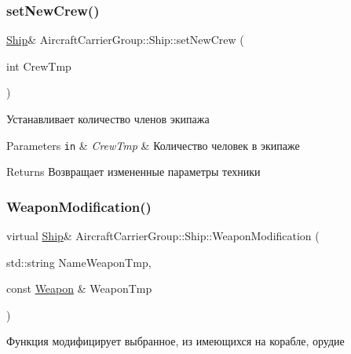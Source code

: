 \subsubsection{\texorpdfstring{set\+New\+Crew()}{setNewCrew()}}
{\footnotesize\ttfamily \mbox{\hyperlink{class_aircraft_carrier_group_1_1_ship}{Ship}}\& Aircraft\+Carrier\+Group\+::\+Ship\+::set\+New\+Crew (\begin{DoxyParamCaption}\item[{int}]{Crew\+Tmp }\end{DoxyParamCaption})\hspace{0.3cm}{\ttfamily [inline]}}



Устанавливает количество членов экипажа 


\begin{DoxyParams}[1]{Parameters}
\mbox{\tt in}  & {\em Crew\+Tmp} & Количество человек в экипаже \\
\hline
\end{DoxyParams}
\begin{DoxyReturn}{Returns}
Возвращает измененные параметры техники 
\end{DoxyReturn}
\mbox{\label{class_aircraft_carrier_group_1_1_ship_a3f91c1ad2960c095cfd88e85df0a3990}} 
\subsubsection{\texorpdfstring{Weapon\+Modification()}{WeaponModification()}}
{\footnotesize\ttfamily virtual \mbox{\hyperlink{class_aircraft_carrier_group_1_1_ship}{Ship}}\& Aircraft\+Carrier\+Group\+::\+Ship\+::\+Weapon\+Modification (\begin{DoxyParamCaption}\item[{std\+::string}]{Name\+Weapon\+Tmp,  }\item[{const \mbox{\hyperlink{class_aircraft_carrier_group_1_1_weapon}{Weapon}} \&}]{Weapon\+Tmp }\end{DoxyParamCaption})\hspace{0.3cm}{\ttfamily [pure virtual]}}



Функция модифицирует выбранное, из имеющихся на корабле, орудие 


